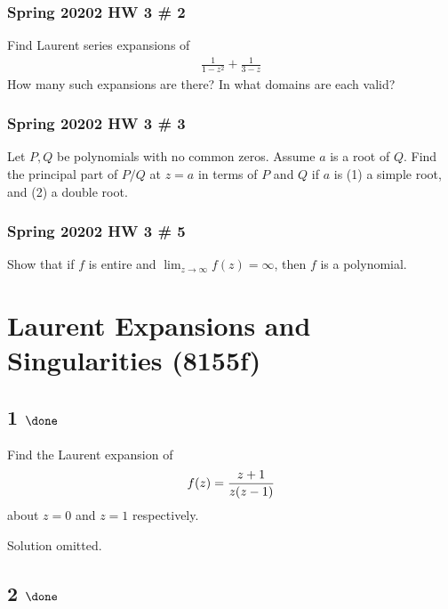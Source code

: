 \hypertarget{spring-20202-hw-3-2}{%
\subsubsection{Spring 20202 HW 3 \# 2}\label{spring-20202-hw-3-2}}

Find Laurent series expansions of
\begin{align*}
\frac{1}{1-z^2} + \frac{1}{3-z}
\end{align*}
How many such expansions are there? In what domains are each valid?

\hypertarget{spring-20202-hw-3-3}{%
\subsubsection{Spring 20202 HW 3 \# 3}\label{spring-20202-hw-3-3}}

Let \(P, Q\) be polynomials with no common zeros. Assume \(a\) is a root
of \(Q\). Find the principal part of \(P/Q\) at \(z=a\) in terms of
\(P\) and \(Q\) if \(a\) is (1) a simple root, and (2) a double root.

\hypertarget{spring-20202-hw-3-5}{%
\subsubsection{Spring 20202 HW 3 \# 5}\label{spring-20202-hw-3-5}}

Show that if \(f\) is entire and \(\lim_{z\to\infty}f(z) = \infty\),
then \(f\) is a polynomial.

\hypertarget{laurent-expansions-and-singularities-8155f}{%
\section{Laurent Expansions and Singularities
(8155f)}\label{laurent-expansions-and-singularities-8155f}}

\hypertarget{done-6}{%
\subsection{\texorpdfstring{1
\(\done\)}{1 \textbackslash done}}\label{done-6}}

Find the Laurent expansion of
\begin{align*}
f(z) = {z + 1 \over z(z-1)}
\end{align*}
about \(z=0\) and \(z=1\) respectively.

Solution omitted.

\hypertarget{done-7}{%
\subsection{\texorpdfstring{2
\(\done\)}{2 \textbackslash done}}\label{done-7}}


